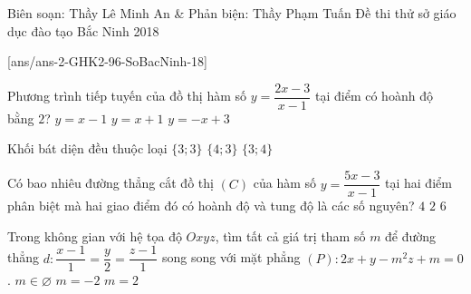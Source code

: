 \begin{name}
{Biên soạn: Thầy Lê Minh An \& Phản biện: Thầy Phạm Tuấn}
{Đề thi thử sở giáo dục đào tạo Bắc Ninh 2018}
\end{name}
\setcounter{ex}{0}
[ans/ans-2-GHK2-96-SoBacNinh-18]
\allowdisplaybreaks
\begin{ex}%
Phương trình tiếp tuyến của đồ thị hàm số $y=\dfrac{2x-3}{x-1}$ tại điểm có hoành độ bằng $2$?
{\True $y=x-1$}
{$y=x+1$}
{$y=-x+3$}
\end{ex}

\begin{ex}%
Khối bát diện đều thuộc loại
{$\{3;3\}$}
{$\{4;3\}$}
{\True $\{3;4\}$}
\end{ex}

\begin{ex}%
Có bao nhiêu đường thẳng cắt đồ thị $(C)$ của hàm số $y=\dfrac{5x-3}{x-1}$ tại hai điểm phân biệt mà hai giao điểm đó có hoành độ và tung độ là các số nguyên?
{$4$}
{$2$}
{\True $6$}
\end{ex}

\begin{ex}%
Trong không gian với hệ tọa độ $Oxyz$, tìm tất cả giá trị tham số $m$ để đường thẳng $d\colon \dfrac{x-1}{1}=\dfrac{y}{2}=\dfrac{z-1}{1}$ song song với mặt phẳng $(P)\colon 2x+y-m^2z+m=0$.
{$m\in\varnothing$}
{\True $m=-2$}
{$m=2$}
\end{ex}

